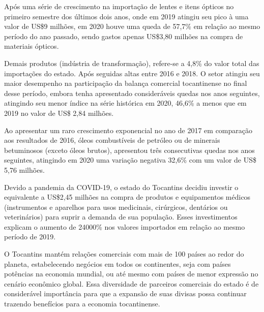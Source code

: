\par Após uma série de crescimento na importação de lentes e itens ópticos no primeiro semestre dos últimos dois anos, onde em 2019 atingiu seu pico à uma valor de US\$9 milhões, em 2020 houve uma queda de 57,7\% em relação ao mesmo período do ano passado, sendo gastos apenas US\$3,80 milhões na compra de materiais ópticos.


\par Demais produtos (indústria de transformação), refere-se a 4,8\% do valor total das importações do estado. Após seguidas altas entre 2016 e 2018. O setor atingiu seu maior desempenho na participação da balança comercial tocantinense no final desse período, embora tenha apresentado consideráveis quedas nos anos seguintes, atingindo seu menor índice na série histórica em 2020, 46,6\% a menos que em 2019 no valor de US\$ 2,84 milhões.

\par Ao apresentar um raro crescimento exponencial no ano de 2017 em comparação aos resultados de 2016, óleos combustíveis de petróleo ou de minerais betuminosos (exceto óleos brutos), apresentou três consecutivas quedas nos anos seguintes, atingindo em 2020 uma variação negativa 32,6\% com um valor de US\$ 5,76 milhões.


\par Devido a pandemia da COVID-19, o estado do Tocantins decidiu investir o equivalente a US\$2,45 milhões na compra de produtos e equipamentos médicos (instrumentos e aparelhos para usos medicinais, cirúrgicos, dentários ou veterinários) para suprir a demanda de sua população. Esses investimentos explicam o aumento de 24000\% nos valores importados em relação ao mesmo período de 2019.


\par O Tocantins mantém relações comerciais com mais de 100 países ao redor do planeta, estabelecendo negócios em todos os continentes, seja com países potências na economia mundial, ou até mesmo com países de menor expressão no cenário econômico global. Essa diversidade de parceiros comerciais do estado é de considerável importância para que a expansão de suas divisas possa continuar trazendo benefícios para a economia tocantinense.



